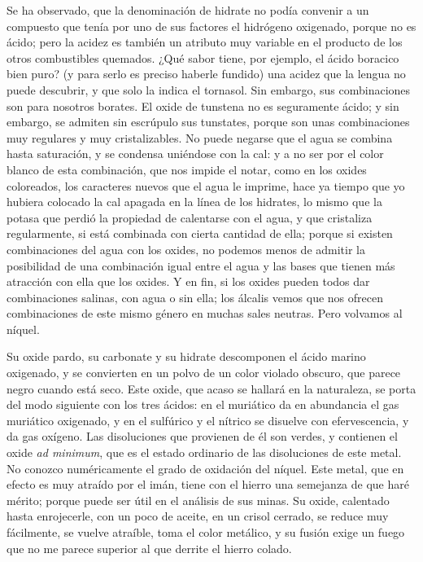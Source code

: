 \documentclass[a4paper, 12pt, oneside, spanish]{article}
\begin{document}
Se ha observado, que la denominación de hidrate no podía convenir a un compuesto que tenía por uno de sus factores el hidrógeno oxigenado, porque no es ácido; pero la acidez es también un atributo muy variable en el producto de los otros combustibles quemados. ¿Qué sabor tiene, por ejemplo, el ácido boracico bien puro? (y para serlo es preciso haberle fundido) una acidez que la lengua no puede descubrir, y que solo la indica el tornasol. Sin embargo, sus combinaciones son para nosotros borates. El oxide de tunstena no es seguramente ácido; y sin embargo, se admiten sin escrúpulo sus tunstates, porque son unas combinaciones muy regulares y muy cristalizables. No puede negarse que el agua se combina hasta saturación, y se condensa uniéndose con la cal: y a no ser por el color blanco de esta combinación, que nos impide el notar, como en los oxides coloreados, los caracteres nuevos que el agua le imprime, hace ya tiempo que yo hubiera colocado la cal apagada en la línea de los hidrates, lo mismo que la potasa que perdió la propiedad de calentarse con el agua, y que cristaliza regularmente, si está combinada con cierta cantidad de ella; porque si existen combinaciones del agua con los oxides, no podemos menos de admitir la posibilidad de una combinación igual entre el agua y las bases que tienen más atracción con ella que los oxides. Y en fin, si los oxides pueden todos dar combinaciones salinas, con agua o sin ella; los álcalis vemos que nos ofrecen combinaciones de este mismo género en muchas sales neutras. Pero volvamos al níquel.

Su oxide pardo, su carbonate y su hidrate descomponen el ácido marino oxigenado, y se convierten en un polvo de un color violado obscuro, que parece negro cuando está seco. Este oxide, que acaso se hallará en la naturaleza, se porta del modo siguiente con los tres ácidos: en el muriático da en abundancia el gas muriático oxigenado, y en el sulfúrico y el nítrico se disuelve con efervescencia, y da gas oxígeno. Las disoluciones que provienen de él son verdes, y contienen el oxide \emph{ad minimum}, que es el estado ordinario de las disoluciones de este metal. No conozco numéricamente el grado de oxidación del níquel. Este metal, que en efecto es muy atraído por el imán, tiene con el hierro una semejanza de que haré mérito; porque puede ser útil en el análisis de sus minas. Su oxide, calentado hasta enrojecerle, con un poco de aceite, en un crisol cerrado, se reduce muy fácilmente, se vuelve atraíble, toma el color metálico, y su fusión exige un fuego que no me parece superior al que derrite el hierro colado.
\end{document}
